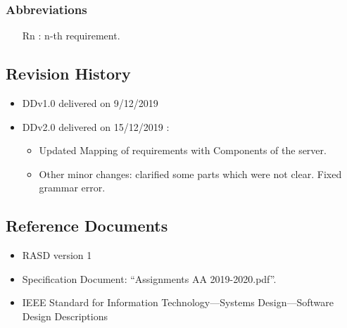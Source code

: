 	\subsubsection {Abbreviations}
\begin{itemize}
\item	[Rn]: n-th requirement.
\end{itemize}
\subsection {Revision History}
\begin{itemize}
\item	DDv1.0 delivered on 9/12/2019
\item 	DDv2.0 delivered on 15/12/2019 :
	\begin{itemize}
		\item Updated Mapping of requirements with Components of the server.
		\item Other minor changes: clarified some parts which were not clear. Fixed grammar error.
	\end{itemize}
\end{itemize}
\subsection {Reference Documents}
\begin{itemize}
\item 	RASD version 1
\item	Specification Document: “Assignments AA 2019-2020.pdf”.
\item	IEEE Standard for Information Technology—Systems Design—Software Design Descriptions
\end{itemize}
